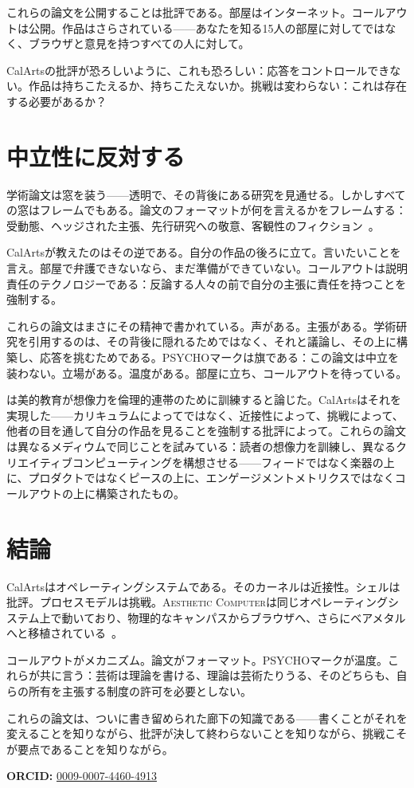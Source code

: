 \documentclass[10pt,letterpaper,twocolumn]{article}
\newcommand{\ac}{\textsc{Aesthetic Computer}}
\begin{document}
これらの論文を公開することは批評である。部屋はインターネット。コールアウトは公開。作品はさらされている——あなたを知る15人の部屋に対してではなく、ブラウザと意見を持つすべての人に対して。

CalArtsの批評が恐ろしいように、これも恐ろしい：応答をコントロールできない。作品は持ちこたえるか、持ちこたえないか。挑戦は変わらない：これは存在する必要があるか？

\section{中立性に反対する}

学術論文は窓を装う——透明で、その背後にある研究を見通せる。しかしすべての窓はフレームでもある。論文のフォーマットが何を言えるかをフレームする：受動態、ヘッジされた主張、先行研究への敬意、客観性のフィクション~\citep{freire1970pedagogy}。

CalArtsが教えたのはその逆である。自分の作品の後ろに立て。言いたいことを言え。部屋で弁護できないなら、まだ準備ができていない。コールアウトは説明責任のテクノロジーである：反論する人々の前で自分の主張に責任を持つことを強制する。

これらの論文はまさにその精神で書かれている。声がある。主張がある。学術研究を引用するのは、その背後に隠れるためではなく、それと議論し、その上に構築し、応答を挑むためである。PSYCHOマークは旗である：この論文は中立を装わない。立場がある。温度がある。部屋に立ち、コールアウトを待っている。

\citet{spivak2012aesthetic}は美的教育が想像力を倫理的連帯のために訓練すると論じた。CalArtsはそれを実現した——カリキュラムによってではなく、近接性によって、挑戦によって、他者の目を通して自分の作品を見ることを強制する批評によって。これらの論文は異なるメディウムで同じことを試みている：読者の想像力を訓練し、異なるクリエイティブコンピューティングを構想させる——フィードではなく楽器の上に、プロダクトではなくピースの上に、エンゲージメントメトリクスではなくコールアウトの上に構築されたもの。

\section{結論}

CalArtsはオペレーティングシステムである。そのカーネルは近接性。シェルは批評。プロセスモデルは挑戦。\ac{}は同じオペレーティングシステム上で動いており、物理的なキャンパスからブラウザへ、さらにベアメタルへと移植されている~\citep{scudder2026ac, scudder2026os}。

コールアウトがメカニズム。論文がフォーマット。PSYCHOマークが温度。これらが共に言う：芸術は理論を書ける、理論は芸術たりうる、そのどちらも、自らの所有を主張する制度の許可を必要としない。

これらの論文は、ついに書き留められた廊下の知識である——書くことがそれを変えることを知りながら、批評が決して終わらないことを知りながら、挑戦こそが要点であることを知りながら。

\vspace{0.5em}
\noindent\textbf{ORCID:} \href{https://orcid.org/0009-0007-4460-4913}{0009-0007-4460-4913}



\end{document}
